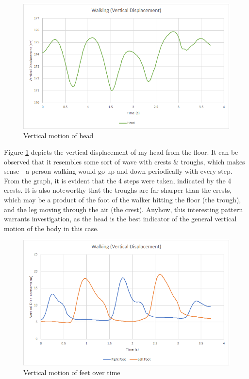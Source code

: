 \documentclass[12pt, a4paper]{article}
\begin{document}
\begin{figure}[H]
    \centering
    \includegraphics[width=12cm]{head_vert.png}
    \caption{Vertical motion of head}
    \label{head_y}
\end{figure}

Figure \ref{head_y} depicts the vertical displacement of my head from the floor.
It can be observed that it resembles some sort of wave with crests \& troughs,
which makes sense - a person walking would go up and down periodically with
every step. From the graph, it is evident that the 4 steps were taken, indicated
by the 4 crests. It is also noteworthy that the troughs are far sharper than the
crests, which may be a product of the foot of the walker hitting the floor (the
trough), and the leg moving through the air (the crest). Anyhow, this
interesting pattern warrants investigation, as the head is the best indicator of
the general vertical motion of the body in this case.

\begin{figure}[H]
    \centering
    \includegraphics[width=12cm]{feet_vert.png}
    \caption{Vertical motion of feet over time}
    \label{feet_y}
\end{figure}
\end{document}
